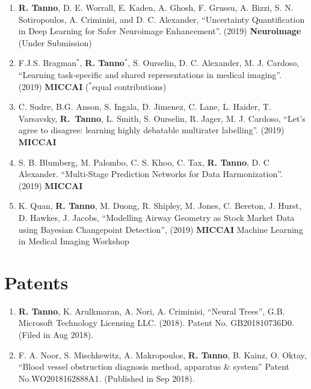 \begin{enumerate}
	\item \textbf{R. Tanno}, D. E. Worrall, E. Kaden, A. Ghosh, F. Grussu, A. Bizzi, S. N. Sotiropoulos, A. Criminisi, and D. C. Alexander, ``Uncertainty Quantification in Deep Learning for Safer Neuroimage Enhancement''. (2019) \textbf{Neuroimage} (Under Submission)
	
	\item F.J.S. Bragman$^*$, \textbf{R. Tanno}$^*$, S. Ourselin, D. C. Alexander, M. J. Cardoso, ``Learning task-specific and shared representations in medical imaging''.  (2019) \textbf{MICCAI} ($^*$equal contributions)
	
	\item C. Sudre, B.G. Anson, S. Ingala, D. Jimenez, C. Lane, L. Haider, T. Varsavsky,  \textbf{R.~Tanno}, L. Smith, S. Ourselin, R. Jager, M. J. Cardoso, ``Let's agree to disagree: learning highly debatable multirater labelling''.  (2019) \textbf{MICCAI} 
	
	\item S. B. Blumberg, M. Palombo, C. S. Khoo, C. Tax, \textbf{R. Tanno}, D. C Alexander. “Multi-Stage Prediction Networks for Data Harmonization”. (2019) \textbf{MICCAI }
	
	\item K. Quan, \textbf{R. Tanno}, M. Duong, R. Shipley, M. Jones, C. Bereton, J. Hurst, D. Hawkes, J. Jacobs, 	``Modelling Airway Geometry as Stock Market Data using Bayesian Changepoint Detection'', (2019) \textbf{MICCAI} Machine Learning in Medical Imaging Workshop
	
\end{enumerate}

\section*{Patents}
\begin{enumerate}
	\item  \textbf{R. Tanno}, K. Arulkmaran, A. Nori, A. Criminisi, “Neural Trees”, G.B. Microsoft Technology Licensing LLC. (2018). Patent No. GB201810736D0. (Filed in Aug 2018).
	\item F. A. Noor, S. Mischkewitz, A. Makropoulos, \textbf{R. Tanno}, B. Kainz, O. Oktay, “Blood vessel obstruction diagnosis method, apparatus \& system”  Patent No.WO2018162888A1. (Published in Sep 2018).
	
\end{enumerate}

